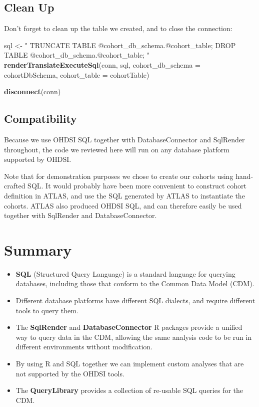 \documentclass[11pt]{book}
\newenvironment{Shaded}{\begin{snugshade}}{\end{snugshade}}
\newcommand{\KeywordTok}[1]{\textcolor[rgb]{0.13,0.29,0.53}{\textbf{#1}}}
\newcommand{\DataTypeTok}[1]{\textcolor[rgb]{0.13,0.29,0.53}{#1}}
\newcommand{\StringTok}[1]{\textcolor[rgb]{0.31,0.60,0.02}{#1}}
\newcommand{\NormalTok}[1]{#1}
\theoremstyle{definition}
\theoremstyle{definition}
\theoremstyle{definition}
\theoremstyle{remark}
\let\BeginKnitrBlock\begin \let\EndKnitrBlock\end
\begin{document}
\subsection{Clean Up}\label{clean-up}

Don't forget to clean up the table we created, and to close the
connection:

\begin{Shaded}
\begin{Highlighting}[]
\NormalTok{sql <-}\StringTok{ "}
\StringTok{TRUNCATE TABLE @cohort_db_schema.@cohort_table;}
\StringTok{DROP TABLE @cohort_db_schema.@cohort_table;}
\StringTok{"}
\KeywordTok{renderTranslateExecuteSql}\NormalTok{(conn, sql,}
                          \DataTypeTok{cohort_db_schema =}\NormalTok{ cohortDbSchema,}
                          \DataTypeTok{cohort_table =}\NormalTok{ cohortTable)}

\KeywordTok{disconnect}\NormalTok{(conn)}
\end{Highlighting}
\end{Shaded}

\subsection{Compatibility}\label{compatibility}

Because we use OHDSI SQL together with DatabaseConnector and SqlRender
throughout, the code we reviewed here will run on any database platform
supported by OHDSI.

Note that for demonstration purposes we chose to create our cohorts
using hand-crafted SQL. It would probably have been more convenient to
construct cohort definition in ATLAS, and use the SQL generated by ATLAS
to instantiate the cohorts. ATLAS also produced OHDSI SQL, and can
therefore easily be used together with SqlRender and DatabaseConnector.

\section{Summary}\label{summary-5}

\BeginKnitrBlock{rmdsummary}
\begin{itemize}
\item
  \textbf{SQL} (Structured Query Language) is a standard language for
  querying databases, including those that conform to the Common Data
  Model (CDM).
\item
  Different database platforms have different SQL dialects, and require
  different tools to query them.
\item
  The \textbf{SqlRender} and \textbf{DatabaseConnector} R packages
  provide a unified way to query data in the CDM, allowing the same
  analysis code to be run in different environments without
  modification.
\item
  By using R and SQL together we can implement custom analyses that are
  not supported by the OHDSI tools.
\item
  The \textbf{QueryLibrary} provides a collection of re-usable SQL
  queries for the CDM.
\end{itemize}
\EndKnitrBlock{rmdsummary}
\end{document}

